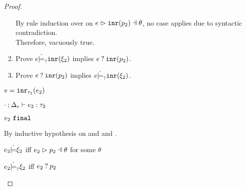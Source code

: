 \begin{proof}
\begin{byCases}
\begin{byCases}
\begin{enumerate}
        By rule induction over  on $\hpatmatch{e}{\hinrp{p_2}}{\theta}$, no case applies due to syntactic contradiction. \\ Therefore, vacuously true.
        \item Prove $e \dot{\models}_{?} \mathtt{inr}(\xi_2)$ implies $e \mathbin{?} \mathtt{inr}(p_2)$.
        \item Prove $e \mathbin{?} \mathtt{inr}(p_2)$ implies $e \dot{\models}_{?} \mathtt{inr}(\xi_2)$.
        \end{enumerate}
    \item[\text{(\ref{rule:TInr})}]
        \begin{pfsteps*}
        \item $e=\mathtt{inr}_{\tau_1}({e_2})$ 
        \item $\cdot \mathbin{;} \Delta_e \vdash e_2 : \tau_2$  
        \item $e_2 ~\mathtt{final}$  
        \end{pfsteps*}
        By inductive hypothesis on  and  and .
        \begin{pfsteps*}
        \item $e_2 \dot{\models} \xi_2$ iff $\hpatmatch{e_2}{p_2}{\theta}$ for some $\theta$ 
        \item $e_2 \dot{\models}_{?} \xi_2$ iff $e_2 \mathbin{?} p_2$ 
        \end{pfsteps*}
        \begin{enumerate}

\end{enumerate}
\end{byCases}
\end{byCases}
\end{proof}
